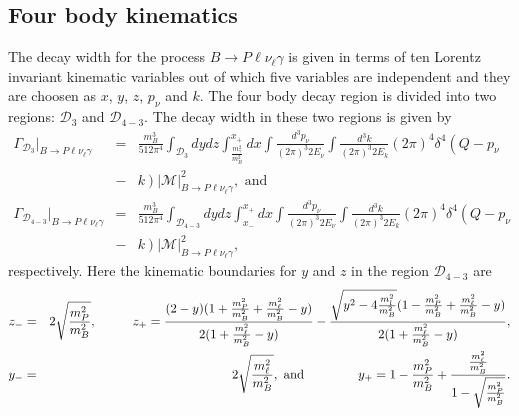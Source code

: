 \documentclass[a4paper,11pt]{article}
\begin{document}
		\subsection{Four body kinematics}
		The decay width for the process $B\to P \ell \nu_{\ell} \gamma$
		is given in terms of ten Lorentz invariant kinematic variables out of which five variables are independent and they are choosen as $x$, $y$, $z$, $p_{\nu}$ and $k$. The four body decay region is divided into two regions: $\mathcal{D}_{3}$ and $\mathcal{D}_{4-3}$. The decay width in these two regions is given by 
		\begin{eqnarray}
		\Gamma_{\mathcal{D}_3}|_{B\to P \ell \nu_{\ell} \gamma} &=&\frac{m_{B}^{3}}{512 \pi^{4}}\int_{\mathcal{D}_{3}} dy dz \int_{\frac{m_{\gamma}^{2}}{m_{B}^{2}}}^{x_{+}} dx  \int \frac{d^{3}p_{\nu}}{(2\pi)^{3} 2E_{\nu}}  \int \frac{d^{3}k}{(2\pi)^{3} 2E_{k}}(2\pi)^{4} \delta^{4}\left(Q- p_{\nu}\right.\nonumber\\&-&\left.k\right) \left|\mathcal{M}\right|_{B\to P \ell \nu_{\ell} \gamma}^{2}, \text{ and}\\
		\Gamma_{ \mathcal{D}_{4-3}}|_{B\to P \ell \nu_{\ell} \gamma}&=&\frac{m_{B}^{3}}{512 \pi^{4}}\int_{\mathcal{D}_{4-3}} dy dz \int_{x_{-}}^{x_{+}} dx  \int \frac{d^{3}p_{\nu}}{(2\pi)^{3} 2E_{\nu}}  \int \frac{d^{3}k}{(2\pi)^{3} 2E_{k}}(2\pi)^{4} \delta^{4}\left(Q- p_{\nu}\right.\nonumber\\&-&\left.k\right) \left|\mathcal{M}\right|_{B\to P \ell \nu_{\ell} \gamma}^{2},
		\end{eqnarray}
		respectively. Here the kinematic boundaries for $y$ and $z$ in the region $\mathcal{D}_{4-3}$ are 
			\begin{eqnarray}
		z_{-}&=&2\sqrt{\frac{m_{P}^{2}}{m_{B}^{2}}},\hspace{1cm} z_{+}=\frac{(2-y)(1+\frac{m_{P}^{2}}{m_{B}^{2}}+\frac{m_{\ell}^{2}}{m_{B}^{2}}-y)}{2(1+\frac{m_{\ell}^{2}}{m_{B}^{2}}-y)}- \frac{\sqrt{y^{2}-4\frac{m_{l}^{2}}{m_{B}^{2}}}(1-\frac{m_{P}^{2}}{m_{B}^{2}}+\frac{m_{\ell}^{2}}{m_{B}^{2}}-y)}{2(1+\frac{m_{\ell}^{2}}{m_{B}^{2}}-y)},\nonumber\\
		y_{-}&=& 2\sqrt{\frac{m_{\ell}^{2}}{m_{B}^{2}}}, \text{ and} \hspace{1.5cm} y_{+}=1-\frac{m_{P}^{2}}{m_{B}^{2}}+\frac{\frac{m_{\ell}^{2}}{m_{B}^{2}}}{1-\sqrt{\frac{m_{P}^{2}}{m_{B}^{2}}}}.\nonumber 
		\end{eqnarray}
\end{document}
